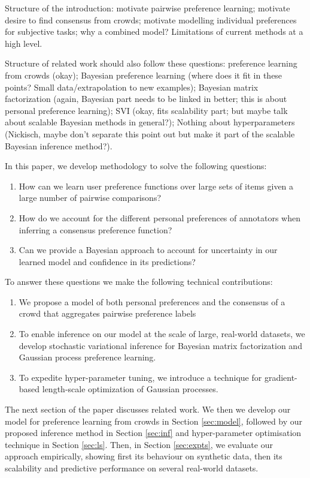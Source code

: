 Structure of the introduction:
motivate pairwise preference learning;
motivate desire to find consensus from crowds;
motivate modelling individual preferences for subjective tasks;
why a combined model?
Limitations of current methods at a high level.

Structure of related work should also follow these questions:
preference learning from crowds (okay); 
Bayesian preference learning (where does it fit in these points? Small data/extrapolation to new examples);
Bayesian matrix factorization (again, Bayesian part needs to be linked in better; this is about personal preference learning);
SVI (okay, fits scalability part; but maybe talk about scalable Bayesian methods in general?);
Nothing about hyperparameters (Nickisch, maybe don't separate this point out but make it part of the scalable Bayesian inference method?).

In this paper, we develop methodology to solve the following questions:
\begin{enumerate}
  \item How can we learn  user preference functions over large sets of items given a large number of pairwise comparisons?
  \item How do we account for the different personal preferences of annotators when inferring a consensus preference function?
  \item Can we provide a Bayesian approach to account for uncertainty in our learned model and confidence in its predictions? 
\end{enumerate}
To answer these questions we make the following technical contributions:
\begin{enumerate}
 \item We propose a model of both personal preferences and the consensus of a crowd 
  that aggregates pairwise preference labels
  \item %
   To enable inference on our model at the scale of large, real-world datasets, we develop
   stochastic variational inference for Bayesian matrix factorization and Gaussian process preference learning.
  \item To expedite hyper-parameter tuning, we introduce a technique for gradient-based length-scale optimization of Gaussian processes.
\end{enumerate}

The next section of the paper discusses related work.
We then we develop our model for preference learning from crowds in Section \ref{sec:model},
followed by our proposed inference method in Section \ref{sec:inf} and
hyper-parameter optimisation technique in Section \ref{sec:ls}.
Then, in Section \ref{sec:expts}, 
we evaluate our approach empirically, showing first its behaviour on synthetic data, 
then its scalability and predictive performance on several real-world datasets.
